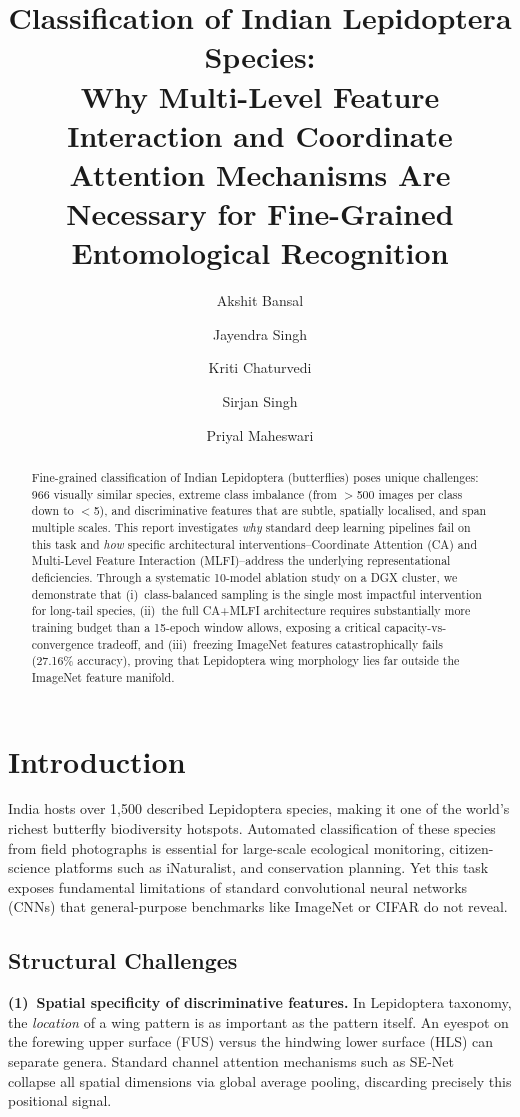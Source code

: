 \documentclass[10pt, twocolumn]{article}
\title{\textbf{Classification of Indian Lepidoptera Species:\\Why Multi-Level Feature Interaction and Coordinate Attention Mechanisms Are Necessary for Fine-Grained Entomological Recognition}}
\author{
  Akshit Bansal \and
  Jayendra Singh \and
  Kriti Chaturvedi \and
  Sirjan Singh \and
  Priyal Maheswari
}
\begin{document}
\maketitle

\begin{abstract}
Fine-grained classification of Indian Lepidoptera (butterflies) poses unique challenges: 966 visually similar species, extreme class imbalance (from $>$500 images per class down to $<$5), and discriminative features that are subtle, spatially localised, and span multiple scales. This report investigates \emph{why} standard deep learning pipelines fail on this task and \emph{how} specific architectural interventions--Coordinate Attention (CA) and Multi-Level Feature Interaction (MLFI)--address the underlying representational deficiencies. Through a systematic 10-model ablation study on a DGX cluster, we demonstrate that (i)~class-balanced sampling is the single most impactful intervention for long-tail species, (ii)~the full CA+MLFI architecture requires substantially more training budget than a 15-epoch window allows, exposing a critical capacity-vs-convergence tradeoff, and (iii)~freezing ImageNet features catastrophically fails (27.16\% accuracy), proving that Lepidoptera wing morphology lies far outside the ImageNet feature manifold.
\end{abstract}

\section{Introduction}
\label{sec:intro}

India hosts over 1,500 described Lepidoptera species, making it one of the world's richest butterfly biodiversity hotspots. Automated classification of these species from field photographs is essential for large-scale ecological monitoring, citizen-science platforms such as iNaturalist, and conservation planning. Yet this task exposes fundamental limitations of standard convolutional neural networks (CNNs) that general-purpose benchmarks like ImageNet or CIFAR do not reveal.

\subsection{Structural Challenges}

\textbf{(1)~Spatial specificity of discriminative features.}
In Lepidoptera taxonomy, the \emph{location} of a wing pattern is as important as the pattern itself. An eyespot on the forewing upper surface (FUS) versus the hindwing lower surface (HLS) can separate genera. Standard channel attention mechanisms such as SE-Net~\cite{hu2018squeeze} collapse all spatial dimensions via global average pooling, discarding precisely this positional signal.
\end{document}
